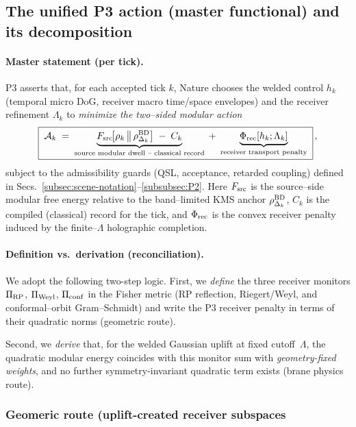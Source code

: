 \documentclass[10pt]{article}
\theoremstyle{definition}
\theoremstyle{plain}
\begin{document}
\subsection{The unified P3 action (master functional) and its decomposition}
\label{subsec:P3-master}

\paragraph{Master statement (per tick).}\label{par:uom-main-050}
P3 asserts that, for each accepted tick $k$, Nature chooses the welded control
$h_k$ (temporal micro DoG, receiver macro time/space envelopes) and the
receiver refinement $\Lambda_k$ to \emph{minimize the two–sided modular action}
\begin{equation}
\boxed{\;
\mathcal A_k \;=\;
\underbrace{F_{\rm src}\!\big[\rho_k\,\big\|\,\rho^{\rm BD}_{\Delta_k}\big]
\;-\;C_k}_{\text{source modular dwell – classical record}}
\;+\;
\underbrace{\Phi_{\rm rec}[h_k;\Lambda_k]}_{\text{receiver transport penalty}}
\;}\,,
\label{eq:Ak-master}
\end{equation}
subject to the admissibility guards (QSL, acceptance, retarded coupling) defined
in Secs.~\ref{subsec:scene-notation}–\ref{subsubsec:P2}.
Here $F_{\rm src}$ is the source–side modular free energy relative to the
band–limited KMS anchor $\rho^{\rm BD}_{\Delta_k}$, $C_k$ is the compiled
(classical) record for the tick, and $\Phi_{\rm rec}$ is the convex receiver
penalty induced by the finite–$\Lambda$ holographic completion.

\paragraph{Definition vs.\ derivation (reconciliation).}\label{par:uom-main-051}
We adopt the following two-step logic. First, we \emph{define} the three receiver monitors
$\Pi_{\rm RP}$, $\Pi_{\rm Weyl}$, $\Pi_{\rm conf}$ in the Fisher metric (RP reflection, Riegert/Weyl,
and conformal–orbit Gram–Schmidt) and write the P3 receiver penalty in terms of their quadratic
norms (geometric route). 

Second, we \emph{derive} that, for the welded Gaussian uplift at fixed cutoff~$\Lambda$,
the quadratic modular energy coincides with this monitor sum with \emph{geometry-fixed weights},
and no further symmetry-invariant quadratic term exists (brane physics route).



\subsubsection*{Geomeric route (uplift-created receiver subspaces}\label{subsubsec:uom-main-005}
\end{document}
